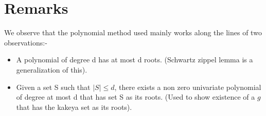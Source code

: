 \section{Remarks}
We observe that the polynomial method used mainly works along the lines of two observations:-
\begin{itemize}
	\item A polynomial of degree d has at most d roots. (Schwartz zippel lemma is a generalization of this).
	\item Given a set S such that $|S| \leq d$, there exists a non zero univariate polynomial of degree at most d that has set S as its roots. (Used to show existence of a $g$ that has the kakeya set as its roots). 
\end{itemize}